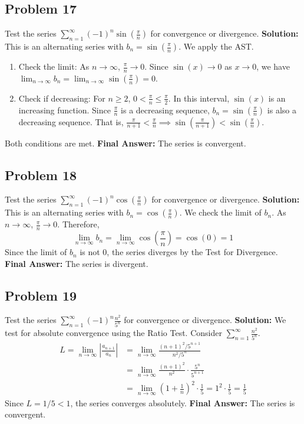 \documentclass{article}
\begin{document}
\subsection*{Problem 17}
Test the series $\sum_{n=1}^{\infty} (-1)^n \sin(\frac{\pi}{n})$ for convergence or divergence.
\textbf{Solution:} This is an alternating series with $b_n = \sin(\frac{\pi}{n})$. We apply the AST.
\begin{enumerate}
    \item Check the limit: As $n \to \infty$, $\frac{\pi}{n} \to 0$. Since $\sin(x) \to 0$ as $x \to 0$, we have $\lim_{n \to \infty} b_n = \lim_{n \to \infty} \sin(\frac{\pi}{n}) = 0$.
    \item Check if decreasing: For $n \ge 2$, $0 < \frac{\pi}{n} \le \frac{\pi}{2}$. In this interval, $\sin(x)$ is an increasing function. Since $\frac{\pi}{n}$ is a decreasing sequence, $b_n = \sin(\frac{\pi}{n})$ is also a decreasing sequence. That is, $\frac{\pi}{n+1} < \frac{\pi}{n} \implies \sin(\frac{\pi}{n+1}) < \sin(\frac{\pi}{n})$.
\end{enumerate}
Both conditions are met.
\textbf{Final Answer:} The series is convergent.

\subsection*{Problem 18}
Test the series $\sum_{n=1}^{\infty} (-1)^n \cos(\frac{\pi}{n})$ for convergence or divergence.
\textbf{Solution:} This is an alternating series with $b_n = \cos(\frac{\pi}{n})$. We check the limit of $b_n$.
As $n \to \infty$, $\frac{\pi}{n} \to 0$. Therefore,
\[ \lim_{n \to \infty} b_n = \lim_{n \to \infty} \cos(\frac{\pi}{n}) = \cos(0) = 1 \]
Since the limit of $b_n$ is not 0, the series diverges by the Test for Divergence.
\textbf{Final Answer:} The series is divergent.

\subsection*{Problem 19}
Test the series $\sum_{n=1}^{\infty} (-1)^n \frac{n^2}{5^n}$ for convergence or divergence.
\textbf{Solution:} We test for absolute convergence using the Ratio Test. Consider $\sum_{n=1}^{\infty} \frac{n^2}{5^n}$.
\begin{align*}
    L = \lim_{n \to \infty} \left| \frac{a_{n+1}}{a_n} \right| &= \lim_{n \to \infty} \frac{(n+1)^2/5^{n+1}}{n^2/5^n} \\
    &= \lim_{n \to \infty} \frac{(n+1)^2}{n^2} \cdot \frac{5^n}{5^{n+1}} \\
    &= \lim_{n \to \infty} \left(1 + \frac{1}{n}\right)^2 \cdot \frac{1}{5} = 1^2 \cdot \frac{1}{5} = \frac{1}{5}
\end{align*}
Since $L=1/5 < 1$, the series converges absolutely.
\textbf{Final Answer:} The series is convergent.
\end{document}
